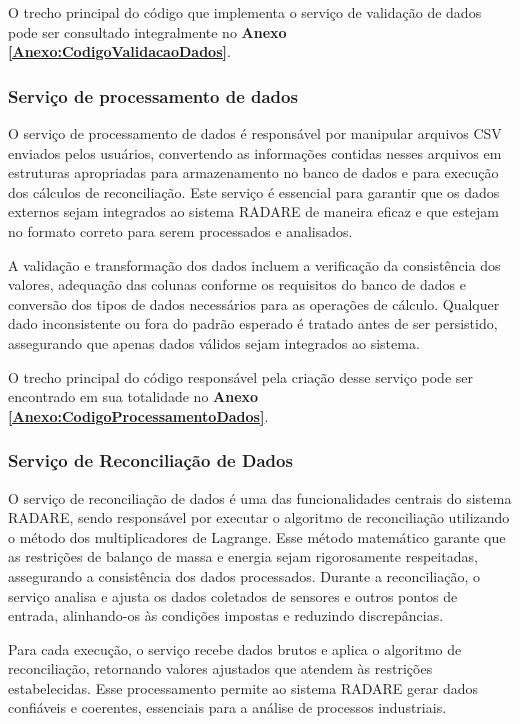 O trecho principal do código que implementa o serviço de validação de dados pode ser consultado integralmente no \textbf{Anexo \ref{Anexo:CodigoValidacaoDados}}.

\subsubsection{Serviço de processamento de dados}

O serviço de processamento de dados é responsável por manipular arquivos CSV enviados pelos usuários, convertendo as informações contidas nesses arquivos em estruturas apropriadas para armazenamento no banco de dados e para execução dos cálculos de reconciliação. Este serviço é essencial para garantir que os dados externos sejam integrados ao sistema RADARE de maneira eficaz e que estejam no formato correto para serem processados e analisados.

A validação e transformação dos dados incluem a verificação da consistência dos valores, adequação das colunas conforme os requisitos do banco de dados e conversão dos tipos de dados necessários para as operações de cálculo. Qualquer dado inconsistente ou fora do padrão esperado é tratado antes de ser persistido, assegurando que apenas dados válidos sejam integrados ao sistema.

O trecho principal do código responsável pela criação desse serviço pode ser encontrado em sua totalidade no \textbf{Anexo \ref{Anexo:CodigoProcessamentoDados}}.

\subsubsection{Serviço de Reconciliação de Dados}

O serviço de reconciliação de dados é uma das funcionalidades centrais do sistema RADARE, sendo responsável por executar o algoritmo de reconciliação utilizando o método dos multiplicadores de Lagrange. Esse método matemático garante que as restrições de balanço de massa e energia sejam rigorosamente respeitadas, assegurando a consistência dos dados processados. Durante a reconciliação, o serviço analisa e ajusta os dados coletados de sensores e outros pontos de entrada, alinhando-os às condições impostas e reduzindo discrepâncias.

Para cada execução, o serviço recebe dados brutos e aplica o algoritmo de reconciliação, retornando valores ajustados que atendem às restrições estabelecidas. Esse processamento permite ao sistema RADARE gerar dados confiáveis e coerentes, essenciais para a análise de processos industriais. 

